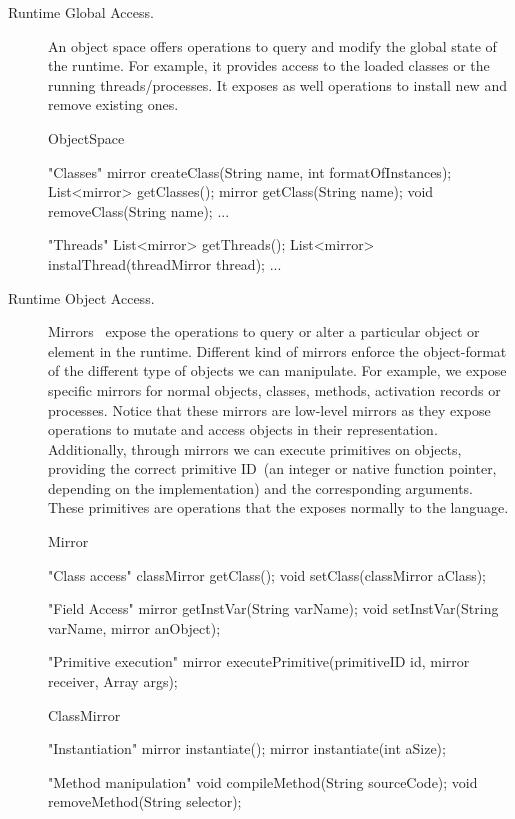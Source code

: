 \begin{description}
\item[Runtime Global Access.] An object space offers operations to query and modify the global state of the runtime. For example, it provides access to the loaded classes or the running threads/processes. It exposes as well operations to install new and remove existing ones.

\begin{code}
ObjectSpace {
    "Classes"
    mirror createClass(String name, int formatOfInstances);
    List<mirror> getClasses();
    mirror getClass(String name);
    void removeClass(String name);
    ...

    "Threads"
    List<mirror> getThreads();
    List<mirror> instalThread(threadMirror thread);
    ...
}
\end{code}

\item[Runtime Object Access.] Mirrors~\cite{Brac04b} expose the operations to query or alter a particular object or element in the runtime. Different kind of mirrors enforce the object-format of the different type of objects we can manipulate. For example, we expose specific mirrors for normal objects, classes, methods, activation records or processes. Notice that these mirrors are low-level mirrors as they expose operations to mutate and access objects in their \VM representation. Additionally, through mirrors we can execute \VM primitives on objects, providing the correct primitive ID~(an integer or native function pointer, depending on the implementation) and the corresponding arguments. These primitives are operations that the \VM exposes normally to the language.

\begin{code}
Mirror {
    "Class access"
    classMirror getClass();
    void setClass(classMirror aClass);

    "Field Access"
    mirror getInstVar(String varName);
    void setInstVar(String varName, mirror anObject);
    
    "Primitive execution"
    mirror executePrimitive(primitiveID id, mirror receiver, Array args);
}
\end{code}

\begin{code}
ClassMirror {
    "Instantiation"
    mirror instantiate();
    mirror instantiate(int aSize);

    "Method manipulation"    
    void compileMethod(String sourceCode);
    void removeMethod(String selector);
}
\end{code}

\end{description}

